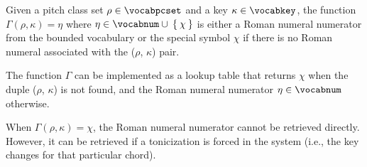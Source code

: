 
Given a pitch class set $\rho \in \vocabpcset$ and a key
$\kappa \in \vocabkey$, the function $\Gamma(\rho, \kappa) =
\eta$ where $\eta \in \vocabnum \cup \: \{ \: \chi \: \}$ is
either a Roman numeral numerator from the bounded vocabulary
or the special symbol $\chi$ if there is no Roman numeral
associated with the ($\rho$, $\kappa$) pair.

The function $\Gamma$ can be implemented as a lookup table
that returns $\chi$ when the duple ($\rho$, $\kappa$) is not
found, and the Roman numeral numerator $\eta \in \vocabnum$
otherwise.

When $\Gamma(\rho, \kappa) = \chi$, the Roman numeral
numerator cannot be retrieved directly. However, it can be
retrieved if a tonicization is forced in the system (i.e.,
the key changes for that particular chord).

